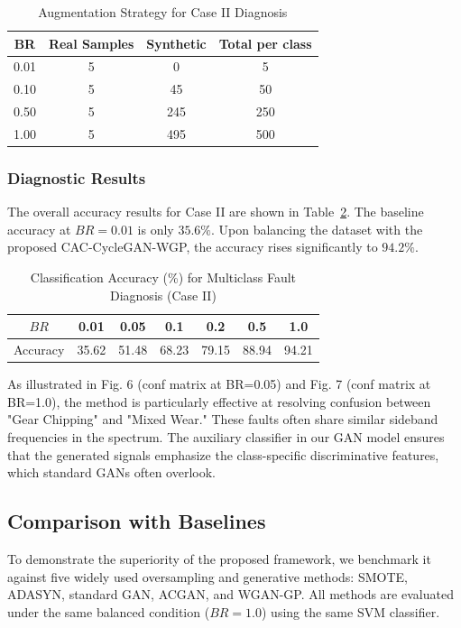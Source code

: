 \begin{table}[htbp]
\centering
\caption{Augmentation Strategy for Case II Diagnosis}
\label{tab:aug_case2}
\begin{tabular}{cccc}
\hline
\textbf{BR} & \textbf{Real Samples} & \textbf{Synthetic} & \textbf{Total per class} \\ \hline
0.01 & 5 & 0 & 5 \\
0.10 & 5 & 45 & 50 \\
0.50 & 5 & 245 & 250 \\
1.00 & 5 & 495 & 500 \\
\hline
\end{tabular}
\end{table}

\subsubsection{Diagnostic Results}
The overall accuracy results for Case II are shown in Table~\ref{tab:acc_case2}. The baseline accuracy at $BR=0.01$ is only $35.6\%$. Upon balancing the dataset with the proposed CAC-CycleGAN-WGP, the accuracy rises significantly to $94.2\%$. 

\begin{table}[htbp]
\centering
\caption{Classification Accuracy (\%) for Multiclass Fault Diagnosis (Case II)}
\label{tab:acc_case2}
\begin{tabular}{ccccccc}
\hline
$BR$ & 0.01 & 0.05 & 0.1 & 0.2 & 0.5 & 1.0 \\ \hline
Accuracy & 35.62 & 51.48 & 68.23 & 79.15 & 88.94 & 94.21 \\
\hline
\end{tabular}
\end{table}

As illustrated in Fig. 6 (conf matrix at BR=0.05) and Fig. 7 (conf matrix at BR=1.0), the method is particularly effective at resolving confusion between "Gear Chipping" and "Mixed Wear." These faults often share similar sideband frequencies in the spectrum. The auxiliary classifier in our GAN model ensures that the generated signals emphasize the class-specific discriminative features, which standard GANs often overlook.

\subsection{Comparison with Baselines}
To demonstrate the superiority of the proposed framework, we benchmark it against five widely used oversampling and generative methods: SMOTE, ADASYN, standard GAN, ACGAN, and WGAN-GP. All methods are evaluated under the same balanced condition ($BR=1.0$) using the same SVM classifier.


